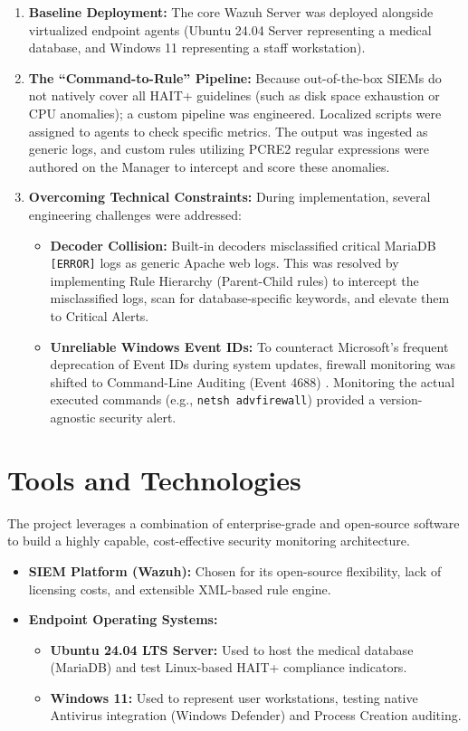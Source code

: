 \begin{enumerate}
\item \textbf{Baseline Deployment:} The core Wazuh Server was deployed alongside virtualized endpoint agents (Ubuntu 24.04 Server representing a medical database, and Windows 11 representing a staff workstation).
\item \textbf{The ``Command-to-Rule'' Pipeline:} Because out-of-the-box
SIEMs do not natively cover all HAIT+ guidelines (such as disk space
exhaustion or CPU anomalies); a custom pipeline was engineered. Localized
scripts were assigned to agents to check specific metrics. The output was
ingested as generic logs, and custom rules utilizing PCRE2 regular
expressions \cite{pcre2} were authored on the Manager to intercept and
score these anomalies.
\item \textbf{Overcoming Technical Constraints:} During implementation, several engineering challenges were addressed:
\begin{itemize}
\item \textbf{Decoder Collision:} Built-in decoders misclassified critical MariaDB \texttt{[ERROR]} logs as generic Apache web logs. This was resolved by implementing Rule Hierarchy (Parent-Child rules) to intercept the misclassified logs, scan for database-specific keywords, and elevate them to Critical Alerts.
\item \textbf{Unreliable Windows Event IDs:} To counteract Microsoft's
frequent deprecation of Event IDs during system updates, firewall monitoring
was shifted to Command-Line Auditing (Event 4688)
\cite{ms_event4688}. Monitoring the actual executed commands (e.g.,
\texttt{netsh advfirewall}) provided a version-agnostic security alert.
\end{itemize}
\end{enumerate}


\section{Tools and Technologies}
\label{sec:tools}
The project leverages a combination of enterprise-grade and open-source software to build a highly capable, cost-effective security monitoring architecture.
\begin{itemize}
\item \textbf{SIEM Platform (Wazuh):} Chosen for its open-source flexibility, lack of licensing costs, and extensible XML-based rule engine.
\item \textbf{Endpoint Operating Systems:}
\begin{itemize}
\item \textbf{Ubuntu 24.04 LTS Server:} Used to host the medical database (MariaDB) and test Linux-based HAIT+ compliance indicators.
\item \textbf{Windows 11:} Used to represent user workstations, testing native Antivirus integration (Windows Defender) and Process Creation auditing.
\end{itemize}
\end{itemize}

